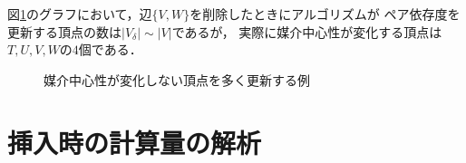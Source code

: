 \begin{example}
  図\ref{fig:bc-many-phony}のグラフにおいて，辺$\{V,W\}$を削除したときにアルゴリズムが
  ペア依存度を更新する頂点の数は$\lvert V_\delta\rvert\sim \lvert V\rvert$であるが，
  実際に媒介中心性が変化する頂点は$T,U,V,W$の$4$個である．

  \begin{figure}[tb]
    \centering
    \def\svgwidth{\linewidth}
    
    \caption{媒介中心性が変化しない頂点を多く更新する例}
    \label{fig:bc-many-phony}
  \end{figure}
\end{example}

\section{挿入時の計算量の解析}
\label{subsect:computational-complexity-of-incremental-algorithm}

